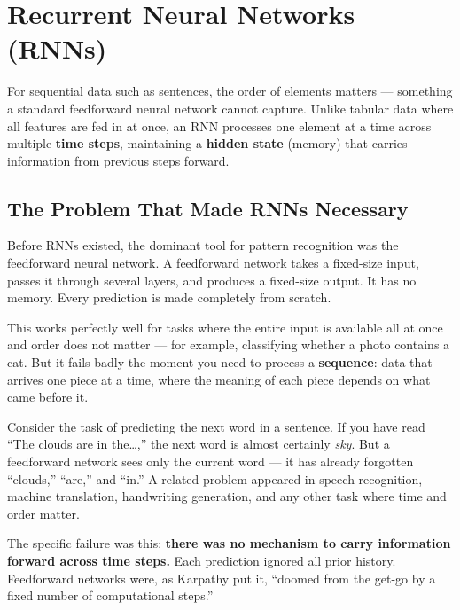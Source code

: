 \section{Recurrent Neural Networks (RNNs)}

For sequential data such as sentences, the order of elements matters --- something a
standard feedforward neural network cannot capture. Unlike tabular data where all
features are fed in at once, an RNN processes one element at a time across multiple
\textbf{time steps}, maintaining a \textbf{hidden state} (memory) that carries
information from previous steps forward.

\subsection{The Problem That Made RNNs Necessary}

Before RNNs existed, the dominant tool for pattern recognition was the feedforward neural
network. A feedforward network takes a fixed-size input, passes it through several layers,
and produces a fixed-size output. It has no memory. Every prediction is made completely
from scratch.

This works perfectly well for tasks where the entire input is available all at once and
order does not matter --- for example, classifying whether a photo contains a cat. But
it fails badly the moment you need to process a \textbf{sequence}: data that arrives one
piece at a time, where the meaning of each piece depends on what came before it.

Consider the task of predicting the next word in a sentence. If you have read ``The clouds
are in the\ldots,'' the next word is almost certainly \textit{sky}. But a feedforward
network sees only the current word --- it has already forgotten ``clouds,'' ``are,'' and
``in.'' A related problem appeared in speech recognition, machine translation, handwriting
generation, and any other task where time and order matter.

The specific failure was this: \textbf{there was no mechanism to carry information
forward across time steps.} Each prediction ignored all prior history.
Feedforward networks were, as Karpathy put it, ``doomed from the get-go by a fixed
number of computational steps.''

